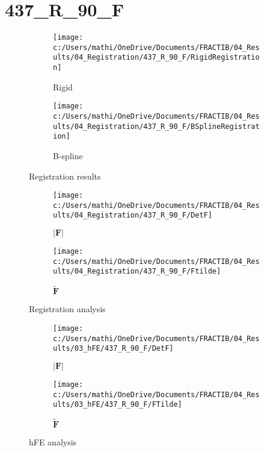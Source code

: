\documentclass{article}%
\begin{document}
%
\newpage%
\section*{437\_R\_90\_F}%
\label{sec:437R90F}%


\begin{figure}[h!]%
\begin{subfigure}[b]{0.5\linewidth}%
\texttt{[image: c:/Users/mathi/OneDrive/Documents/FRACTIB/04\_Results/04\_Registration/437\_R\_90\_F/RigidRegistration]}%
\caption{Rigid}%
\end{subfigure}%
\begin{subfigure}[b]{0.5\linewidth}%
\texttt{[image: c:/Users/mathi/OneDrive/Documents/FRACTIB/04\_Results/04\_Registration/437\_R\_90\_F/BSplineRegistration]}%
\caption{B{-}spline}%
\end{subfigure}%
\caption{Registration results}%
\end{figure}

%


\begin{figure}[h!]%
\begin{subfigure}[b]{0.5\linewidth}%
\texttt{[image: c:/Users/mathi/OneDrive/Documents/FRACTIB/04\_Results/04\_Registration/437\_R\_90\_F/DetF]}%
\caption{$|\mathbf{F}|$}%
\end{subfigure}%
\begin{subfigure}[b]{0.5\linewidth}%
\texttt{[image: c:/Users/mathi/OneDrive/Documents/FRACTIB/04\_Results/04\_Registration/437\_R\_90\_F/Ftilde]}%
\caption{$\tilde{\mathbf{F}}$}%
\end{subfigure}%
\caption{Registration analysis}%
\end{figure}

%


\begin{figure}[h!]%
\begin{subfigure}[b]{0.5\linewidth}%
\texttt{[image: c:/Users/mathi/OneDrive/Documents/FRACTIB/04\_Results/03\_hFE/437\_R\_90\_F/DetF]}%
\caption{$|\mathbf{F}|$}%
\end{subfigure}%
\begin{subfigure}[b]{0.5\linewidth}%
\texttt{[image: c:/Users/mathi/OneDrive/Documents/FRACTIB/04\_Results/03\_hFE/437\_R\_90\_F/FTilde]}%
\caption{$\tilde{\mathbf{F}}$}%
\end{subfigure}%
\caption{hFE analysis}%
\end{figure}
\end{document}
